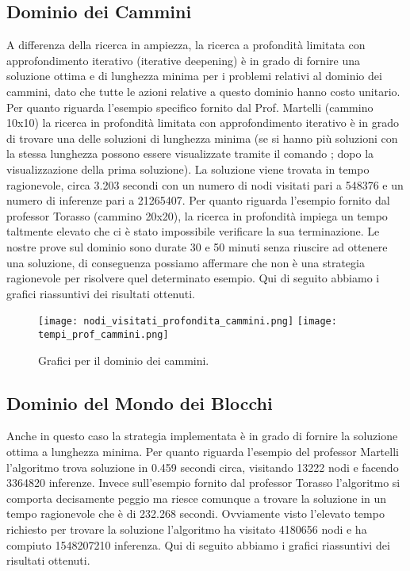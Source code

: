 \subsection{Dominio dei Cammini}
A differenza della ricerca in ampiezza, la ricerca a profondità limitata con approfondimento iterativo (iterative deepening) è in grado di fornire una soluzione ottima e di lunghezza minima per i problemi relativi al dominio dei cammini, dato che tutte le azioni relative a questo dominio hanno costo unitario. Per quanto riguarda l'esempio specifico fornito dal Prof. Martelli (cammino 10x10) la ricerca in profondità limitata con approfondimento iterativo è in grado di trovare una delle soluzioni di lunghezza minima (se si hanno più soluzioni con la stessa lunghezza possono essere visualizzate tramite il comando ; dopo la visualizzazione della prima soluzione). La soluzione viene trovata in tempo ragionevole, circa 3.203 secondi con un numero di nodi visitati pari a 548376 e un numero di inferenze pari a 21265407. Per quanto riguarda l'esempio fornito dal professor Torasso (cammino 20x20), la ricerca in profondità impiega un tempo taltmente elevato che ci è stato impossibile verificare la sua terminazione. Le nostre prove sul dominio sono durate 30 e 50 minuti senza riuscire ad ottenere una soluzione, di conseguenza possiamo affermare che non è una strategia ragionevole per risolvere quel determinato esempio.
Qui di seguito abbiamo i grafici riassuntivi dei risultati ottenuti.

\begin{landscape}
\begin{sidewaysfigure}
\centering
{\texttt{[image: nodi\_visitati\_profondita\_cammini.png]}}\qquad\qquad
{\texttt{[image: tempi\_prof\_cammini.png]}}\qquad\qquad
\caption{Grafici per il dominio dei cammini.}
\end{sidewaysfigure}
\end{landscape}

\subsection{Dominio del Mondo dei Blocchi}
Anche in questo caso la strategia implementata è in grado di fornire la soluzione ottima a lunghezza minima. Per quanto riguarda l'esempio del professor Martelli l'algoritmo trova soluzione in 0.459 secondi circa, visitando 13222 nodi e facendo 3364820 inferenze. Invece sull'esempio fornito dal professor Torasso l'algoritmo si comporta decisamente peggio ma riesce comunque a trovare la soluzione in un tempo ragionevole che è di 232.268 secondi. Ovviamente visto l'elevato tempo richiesto per trovare la soluzione l'algoritmo ha visitato 4180656 nodi e ha compiuto 1548207210 inferenza.
Qui di seguito abbiamo i grafici riassuntivi dei risultati ottenuti.

